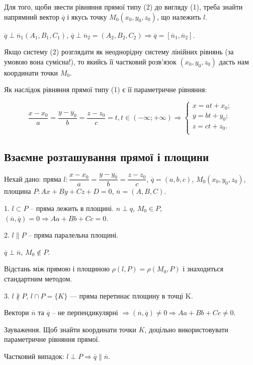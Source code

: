 Для того, щоби звести рівняння прямої типу (2) до вигляду (1), треба
знайти напрямний вектор $\overline{q}$ і якусь точку $M_0(x_0,y_0,z_0)$, що належить $l$.

$\overline{q} \perp \overline{n}_1(A_1,B_1,C_1)$, $\overline{q} \perp \overline{n}_2 = (A_2,B_2,C_2) \Rightarrow \overline{q} = [\overline{n}_1,\overline{n}_2].$


Якщо систему (2) розглядати як неоднорідну систему лінійних рівнянь
(за умовою вона сумісна!), то якийсь її частковий розв’язок $(x_0,y_0,z_0)$ дасть
нам координати точки $M_0$.

Як наслідок рівняння прямої типу (1) є її параметричне рівняння:

$$\dfrac{x-x_0}{a} = \dfrac{y-y_0}{b} = \dfrac{z-z_0}{c} = t, t \in (-\infty;+\infty) \Rightarrow 
\left\{ \begin{matrix}
	x = at +x_0; \\
	y = bt +y_0; \\
	z = ct +z_0. \\
\end{matrix} \right.$$


\subsection{Взаємне розташування прямої і площини}


Нехай дано:
пряма $l: \dfrac{x-x_0}{a} = \dfrac{y-y_0}{b} = \dfrac{z-z_0}{c}$, $\overline{q} = (a,b,c)$,
$M_0(x_0,y_0,z_0)$,
площина $P: Ax + By + Cz + D = 0$, $\overline{n} = (A,B,C)$.

1. $l \subset P$ -- пряма лежить в площині. 
$n \perp q$,
$M_0 \in P$, $(\overline{n},\overline{q}) = 0 \Rightarrow Aa + Bb + Cc = 0$.


2. $l \parallel P$ -- пряма паралельна площині.

$\overline{q} \perp \overline{n}$, $M_0 \notin P$.

Відстань між прямою і площиною
$\rho(l,P) = \rho(M_0,P)$ і
знаходиться стандартним методом.


3. $l \nparallel P$, $l \cap P = \{K\}$ — пряма перетинає площину в точці K.

Вектори $\overline{n}$ та $\overline{q}$ -- не перпендикулярні
$\Rightarrow (\overline{n},\overline{q}) \neq 0 \Rightarrow Aa + Bb + Cc \neq 0$.

Зауваження. Щоб знайти координати точки $K$, доцільно
використовувати параметричне рівняння прямої.

Частковий випадок:
$l \perp P \Rightarrow \overline{q} \parallel \overline{n}$.


